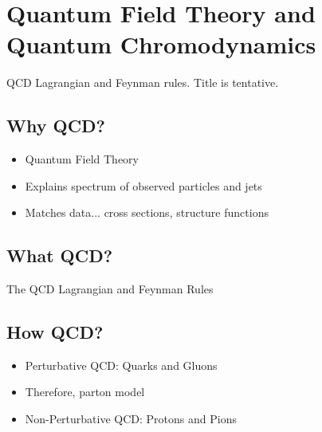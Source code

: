 

\section{Quantum Field Theory and Quantum Chromodynamics}
QCD Lagrangian and Feynman rules.
%
Title is tentative.



\subsection{Why QCD?}
\begin{itemize}
    \item
        Quantum Field Theory

    \item
        Explains spectrum of observed particles and jets

    \item
        Matches data... cross sections, structure functions
\end{itemize}


\subsection{What QCD?}
The QCD Lagrangian and Feynman Rules


\subsection{How QCD?}
\begin{itemize}
    \item
        Perturbative QCD: Quarks and Gluons

    \item
        Therefore, parton model

    \item
        Non-Perturbative QCD: Protons and Pions
\end{itemize}

